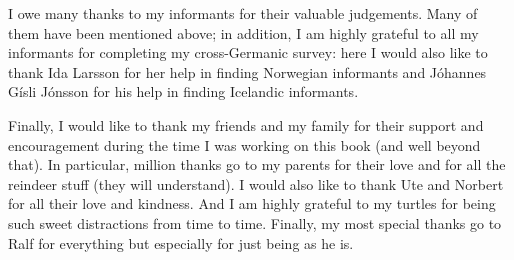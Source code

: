 I owe many thanks to my informants for their valuable judgements. Many of them have been mentioned above; in addition, I am highly grateful to all my informants for completing my cross-Germanic survey: here I would also like to thank Ida Larsson for her help in finding Norwegian informants and Jóhannes Gísli Jónsson for his help in finding Icelandic informants.

Finally, I would like to thank my friends and my family for their support and encouragement during the time I was working on this book (and well beyond that). In particular, million thanks go to my parents for their love and for all the reindeer stuff (they will understand). I would also like to thank Ute and Norbert for all their love and kindness. And I am highly grateful to my turtles for being such sweet distractions from time to time. Finally, my most special thanks go to Ralf for everything but especially for just being as he is.

